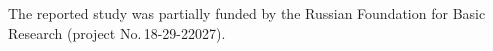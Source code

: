 \vspace*{-16pt}

\Ack
  \noindent
  The reported study was partially funded by the Russian Foundation for Basic Research (project 
No.\,18-29-22027).





  \begin{multicols}{2}

\renewcommand{\bibname}{\protect\rmfamily References}

{\small\frenchspacing
 {%
 \begin{thebibliography}{99}
  

\end{thebibliography}}}
\end{multicols}
